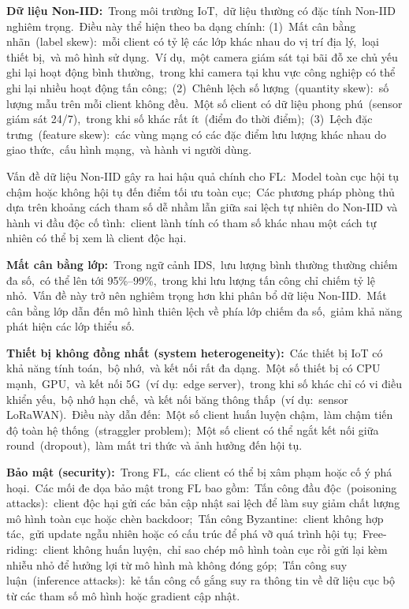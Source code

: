 \textbf{Dữ liệu Non-IID:}~Trong môi trường IoT,~dữ liệu thường có đặc tính Non-IID nghiêm trọng.~Điều này thể hiện theo ba dạng chính: (1)~Mất cân bằng nhãn~(label skew):~mỗi client có tỷ lệ các lớp khác nhau do vị trí địa lý,~loại thiết bị,~và mô hình sử dụng.~Ví dụ,~một camera giám sát tại bãi đỗ xe chủ yếu ghi lại hoạt động bình thường,~trong khi camera tại khu vực công nghiệp có thể ghi lại nhiều hoạt động tấn công;~(2)~Chênh lệch số lượng~(quantity skew):~số lượng mẫu trên mỗi client không đều.~Một số client có dữ liệu phong phú~(sensor giám sát 24/7),~trong khi số khác rất ít~(điểm đo thời điểm);~(3)~Lệch đặc trưng~(feature skew):~các vùng mạng có các đặc điểm lưu lượng khác nhau do giao thức,~cấu hình mạng,~và hành vi người dùng.

Vấn đề dữ liệu Non-IID gây ra hai hậu quả chính cho FL:~Model toàn cục hội tụ chậm hoặc không hội tụ đến điểm tối ưu toàn cục;~Các phương pháp phòng thủ dựa trên khoảng cách tham số dễ nhầm lẫn giữa sai lệch tự nhiên do Non-IID và hành vi đầu độc cố tình:~client lành tính có tham số khác nhau một cách tự nhiên có thể bị xem là client độc hại.

\textbf{Mất cân bằng lớp:}~Trong ngữ cảnh IDS,~lưu lượng bình thường thường chiếm đa số,~có thể lên tới 95\%--99\%,~trong khi lưu lượng tấn công chỉ chiếm tỷ lệ nhỏ.~Vấn đề này trở nên nghiêm trọng hơn khi phân bổ dữ liệu Non-IID.~Mất cân bằng lớp dẫn đến mô hình thiên lệch về phía lớp chiếm đa số,~giảm khả năng phát hiện các lớp thiểu số.

\textbf{Thiết bị không đồng nhất (system heterogeneity):}~Các thiết bị IoT có khả năng tính toán,~bộ nhớ,~và kết nối rất đa dạng.~Một số thiết bị có CPU mạnh,~GPU,~và kết nối 5G~(ví dụ:~edge server),~trong khi số khác chỉ có vi điều khiển yếu,~bộ nhớ hạn chế,~và kết nối băng thông thấp~(ví dụ:~sensor LoRaWAN).~Điều này dẫn đến:~Một số client huấn luyện chậm,~làm chậm tiến độ toàn hệ thống~(straggler problem);~Một số client có thể ngắt kết nối giữa round~(dropout),~làm mất tri thức và ảnh hưởng đến hội tụ.

\textbf{Bảo mật (security):}~Trong FL,~các client có thể bị xâm phạm hoặc cố ý phá hoại.~Các mối đe dọa bảo mật trong FL bao gồm:~Tấn công đầu độc~(poisoning attacks):~client độc hại gửi các bản cập nhật sai lệch để làm suy giảm chất lượng mô hình toàn cục hoặc chèn backdoor;~Tấn công Byzantine:~client không hợp tác,~gửi update ngẫu nhiên hoặc có cấu trúc để phá vỡ quá trình hội tụ;~Free-riding:~client không huấn luyện,~chỉ sao chép mô hình toàn cục rồi gửi lại kèm nhiễu nhỏ để hưởng lợi từ mô hình mà không đóng góp;~Tấn công suy luận~(inference attacks):~kẻ tấn công cố gắng suy ra thông tin về dữ liệu cục bộ từ các tham số mô hình hoặc gradient cập nhật.


